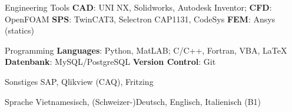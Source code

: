 

\begin{cvskills}


  \cvskill
    {Engineering Tools} %
    {\textbf{CAD}: UNI NX, Solidworks, Autodesk Inventor; 
    \newline \textbf{CFD}: OpenFOAM
    \newline \textbf{SPS}: TwinCAT3, Selectron CAP1131, CodeSys
	\newline \textbf{FEM}: Ansys (statics)} %

%

  \cvskill
    {Programming} %
    {\textbf{Languages}: Python, MatLAB; C/C++, Fortran, VBA, LaTeX 
    	\newline \textbf{Datenbank}: MySQL/PostgreSQL
    	\newline \textbf{Version Control}: Git
    	} %

  \cvskill
    {Sonstiges} %
    {SAP, Qlikview (CAQ), Fritzing} %

  \cvskill
    {Sprache} %
    {Vietnamesisch, (Schweizer-)Deutsch, Englisch, Italienisch (B1)} %

\end{cvskills}
